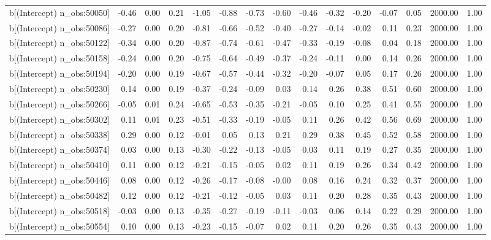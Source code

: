 \begin{table}[ht]
\begin{tabular}{rrrrrrrrrrrrrrr}
  b[(Intercept) n\_obs:50050] & -0.46 & 0.00 & 0.21 & -1.05 & -0.88 & -0.73 & -0.60 & -0.46 & -0.32 & -0.20 & -0.07 & 0.05 & 2000.00 & 1.00 \\ 
  b[(Intercept) n\_obs:50086] & -0.27 & 0.00 & 0.20 & -0.81 & -0.66 & -0.52 & -0.40 & -0.27 & -0.14 & -0.02 & 0.11 & 0.23 & 2000.00 & 1.00 \\ 
  b[(Intercept) n\_obs:50122] & -0.34 & 0.00 & 0.20 & -0.87 & -0.74 & -0.61 & -0.47 & -0.33 & -0.19 & -0.08 & 0.04 & 0.18 & 2000.00 & 1.00 \\ 
  b[(Intercept) n\_obs:50158] & -0.24 & 0.00 & 0.20 & -0.75 & -0.64 & -0.49 & -0.37 & -0.24 & -0.11 & 0.00 & 0.14 & 0.26 & 2000.00 & 1.00 \\ 
  b[(Intercept) n\_obs:50194] & -0.20 & 0.00 & 0.19 & -0.67 & -0.57 & -0.44 & -0.32 & -0.20 & -0.07 & 0.05 & 0.17 & 0.26 & 2000.00 & 1.00 \\ 
  b[(Intercept) n\_obs:50230] & 0.14 & 0.00 & 0.19 & -0.37 & -0.24 & -0.09 & 0.03 & 0.14 & 0.26 & 0.38 & 0.51 & 0.60 & 2000.00 & 1.00 \\ 
  b[(Intercept) n\_obs:50266] & -0.05 & 0.01 & 0.24 & -0.65 & -0.53 & -0.35 & -0.21 & -0.05 & 0.10 & 0.25 & 0.41 & 0.55 & 2000.00 & 1.00 \\ 
  b[(Intercept) n\_obs:50302] & 0.11 & 0.01 & 0.23 & -0.51 & -0.33 & -0.19 & -0.05 & 0.11 & 0.26 & 0.42 & 0.56 & 0.69 & 2000.00 & 1.00 \\ 
  b[(Intercept) n\_obs:50338] & 0.29 & 0.00 & 0.12 & -0.01 & 0.05 & 0.13 & 0.21 & 0.29 & 0.38 & 0.45 & 0.52 & 0.58 & 2000.00 & 1.00 \\ 
  b[(Intercept) n\_obs:50374] & 0.03 & 0.00 & 0.13 & -0.30 & -0.22 & -0.13 & -0.05 & 0.03 & 0.11 & 0.19 & 0.27 & 0.35 & 2000.00 & 1.00 \\ 
  b[(Intercept) n\_obs:50410] & 0.11 & 0.00 & 0.12 & -0.21 & -0.15 & -0.05 & 0.02 & 0.11 & 0.19 & 0.26 & 0.34 & 0.42 & 2000.00 & 1.00 \\ 
  b[(Intercept) n\_obs:50446] & 0.08 & 0.00 & 0.12 & -0.26 & -0.17 & -0.08 & -0.00 & 0.08 & 0.16 & 0.24 & 0.32 & 0.37 & 2000.00 & 1.00 \\ 
  b[(Intercept) n\_obs:50482] & 0.12 & 0.00 & 0.12 & -0.21 & -0.12 & -0.05 & 0.03 & 0.11 & 0.20 & 0.28 & 0.35 & 0.43 & 2000.00 & 1.00 \\ 
  b[(Intercept) n\_obs:50518] & -0.03 & 0.00 & 0.13 & -0.35 & -0.27 & -0.19 & -0.11 & -0.03 & 0.06 & 0.14 & 0.22 & 0.29 & 2000.00 & 1.00 \\ 
  b[(Intercept) n\_obs:50554] & 0.10 & 0.00 & 0.13 & -0.23 & -0.15 & -0.07 & 0.02 & 0.11 & 0.20 & 0.26 & 0.35 & 0.43 & 2000.00 & 1.00 \\ 

\end{tabular}
\end{table}
